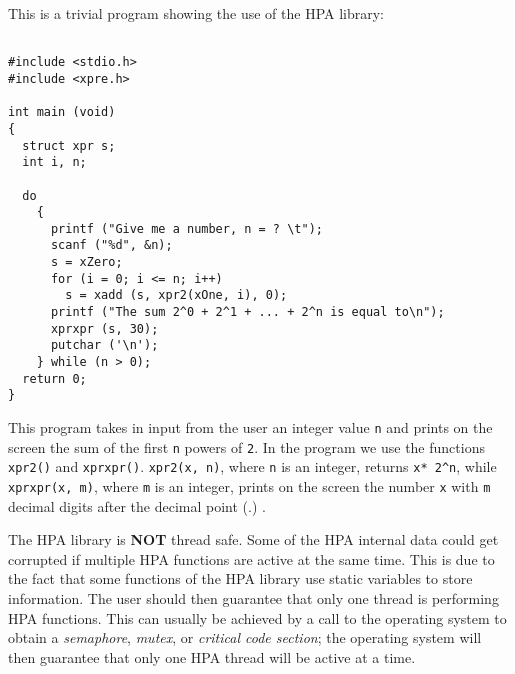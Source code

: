 \documentclass{article}
\begin{document}
This is a trivial program showing the use of the HPA library:

\begin{verbatim}

#include <stdio.h>
#include <xpre.h>

int main (void)
{
  struct xpr s;
  int i, n;

  do
    {
      printf ("Give me a number, n = ? \t");
      scanf ("%d", &n);
      s = xZero;
      for (i = 0; i <= n; i++)
        s = xadd (s, xpr2(xOne, i), 0);
      printf ("The sum 2^0 + 2^1 + ... + 2^n is equal to\n");
      xprxpr (s, 30);
      putchar ('\n');
    } while (n > 0);
  return 0;
}

\end{verbatim}
This program takes in input from the user an integer value \texttt{n}
and prints on the screen the sum of the first \texttt{n} powers of \texttt{2}.
In the program we use the functions \texttt{xpr2()} and \texttt{xprxpr()}.
\texttt{xpr2(x, n)}, where \texttt{n} is an integer, returns \texttt{x* 2\^{}n}, while
\texttt{xprxpr(x, m)}, where \texttt{m} is an integer, prints on the screen
the number \texttt{x} with \texttt{m} decimal digits after the decimal point (.) .

The HPA library is \textbf{NOT} thread safe. Some of the HPA internal
data could get corrupted if multiple HPA functions are active at the
same time. This is due to the fact that some functions of the HPA library
use static variables to store information.
The user should then guarantee that only one thread is performing
HPA functions. This can usually be achieved by a call to the operating
system to obtain a \textit{semaphore}, \textit{mutex},  or \textit{critical code section};
the operating system will then guarantee that only one HPA thread will be
active at a time.


\hypertarget{runtime_errors}{}
\end{document}
